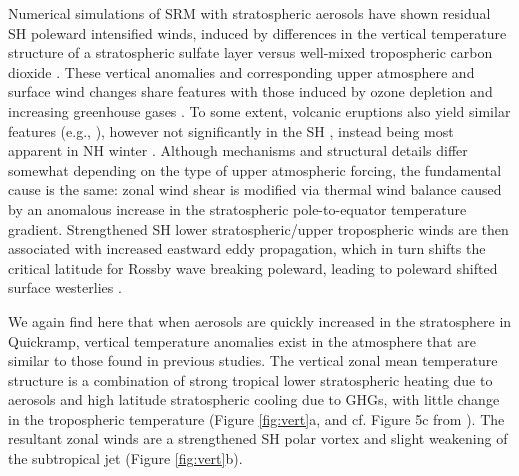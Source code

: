 \documentclass[grl]{AGUTeX}  %
\begin{document}
\begin{article}
Numerical simulations of SRM with stratospheric aerosols have shown residual SH poleward intensified winds, induced by differences in the vertical temperature structure of a stratospheric sulfate layer versus well-mixed tropospheric carbon dioxide \citep{ammann10,mccusker12}. These vertical anomalies and corresponding upper atmosphere and surface wind changes share features with those induced by ozone depletion \citep{gillett03,gillett13,sigmond11,thompson11} and increasing greenhouse gases \citep{gillett13,sigmond11,polvani11}. To some extent, volcanic eruptions also yield similar features (e.g., \citet{free09}), however not significantly in the SH \citep{robock07}, instead being most apparent in NH winter \citep{robock00,shindell04,stenchikov06}. Although mechanisms and structural details differ somewhat depending on the type of upper atmospheric forcing, the fundamental cause is the same: zonal wind shear is modified via thermal wind balance caused by an anomalous increase in the stratospheric pole-to-equator temperature gradient. Strengthened SH lower stratospheric/upper tropospheric winds are then associated with increased eastward eddy propagation, which in turn shifts the critical latitude for Rossby wave breaking poleward, leading to poleward shifted surface westerlies \citep{chen07}.%

We again find here that when aerosols are quickly increased in the stratosphere in Quickramp, vertical temperature anomalies exist in the atmosphere that are similar to those found in previous studies. The vertical zonal mean temperature structure is a combination of strong tropical lower stratospheric heating due to aerosols \citep{ferraro11} and high latitude stratospheric cooling due to GHGs, with little change in the tropospheric temperature (Figure \ref{fig:vert}a, and cf. Figure 5c from \citet{mccusker12}). The resultant zonal winds are a strengthened SH polar vortex and slight weakening of the subtropical jet (Figure \ref{fig:vert}b). %


\end{article}
\end{document}
